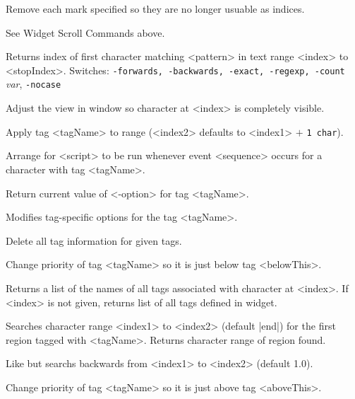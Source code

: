 \begin{enum}{1cm}
Remove each mark specified so they are no longer usuable as indices.

See Widget Scroll Commands above.

Returns index of first character matching <pattern> in text range
<index> to <stopIndex>. Switches: {\small {\tt -forwards, -backwards,
-exact, -regexp, -count} {\it var}, {\tt -nocase}}

Adjust the view in window so character at <index> is completely visible.

Apply tag <tagName> to range (<index2> defaults to <index1> $+$ {\tt 1 char}).

Arrange for <script> to be run whenever event <sequence> occurs
for a character with tag <tagName>.

Return current value of <-option> for tag <tagName>.

Modifies tag-specific options for the tag <tagName>.

Delete all tag information for given tags.

Change priority of tag <tagName> so it is just below tag <belowThis>.

Returns a list of the names of all tags associated with character at <index>.
If <index> is not given, returns list of all tags defined in widget.

Searches character range <index1> to <index2> (default |end|) for the first
region tagged with <tagName>. Returns character range of region found.

Like  but searchs backwards from <index1> to 
<index2> (default 1.0).

Change priority of tag <tagName> so it is just above tag <aboveThis>.


\end{enum}
